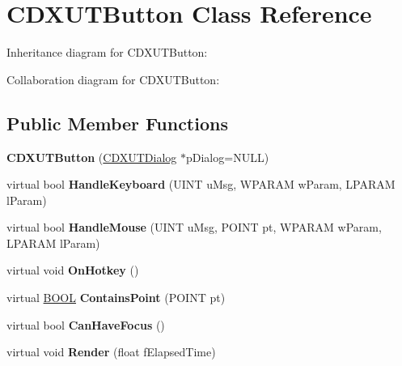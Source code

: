 \hypertarget{class_c_d_x_u_t_button}{\section{C\+D\+X\+U\+T\+Button Class Reference}
\label{class_c_d_x_u_t_button}
}


Inheritance diagram for C\+D\+X\+U\+T\+Button\+:


Collaboration diagram for C\+D\+X\+U\+T\+Button\+:
\subsection*{Public Member Functions}
\begin{DoxyCompactItemize}
\item 
\hypertarget{class_c_d_x_u_t_button_a05e8d838ea4ce93b2a7c70e78d41a95a}{{\bfseries C\+D\+X\+U\+T\+Button} (\hyperlink{class_c_d_x_u_t_dialog}{C\+D\+X\+U\+T\+Dialog} $\ast$p\+Dialog=N\+U\+L\+L)}\label{class_c_d_x_u_t_button_a05e8d838ea4ce93b2a7c70e78d41a95a}

\item 
\hypertarget{class_c_d_x_u_t_button_ae8da8eb3729b62ac3651eeca42d72530}{virtual bool {\bfseries Handle\+Keyboard} (U\+I\+N\+T u\+Msg, W\+P\+A\+R\+A\+M w\+Param, L\+P\+A\+R\+A\+M l\+Param)}\label{class_c_d_x_u_t_button_ae8da8eb3729b62ac3651eeca42d72530}

\item 
\hypertarget{class_c_d_x_u_t_button_ac0bb3da0b5cc77e4cadfbbed72d3e5b7}{virtual bool {\bfseries Handle\+Mouse} (U\+I\+N\+T u\+Msg, P\+O\+I\+N\+T pt, W\+P\+A\+R\+A\+M w\+Param, L\+P\+A\+R\+A\+M l\+Param)}\label{class_c_d_x_u_t_button_ac0bb3da0b5cc77e4cadfbbed72d3e5b7}

\item 
\hypertarget{class_c_d_x_u_t_button_ae63ba50da1c035a9aaa983bafd5eae97}{virtual void {\bfseries On\+Hotkey} ()}\label{class_c_d_x_u_t_button_ae63ba50da1c035a9aaa983bafd5eae97}

\item 
\hypertarget{class_c_d_x_u_t_button_a2209ea24f5ba76d7506b368c80940172}{virtual \hyperlink{_ice_types_8h_a050c65e107f0c828f856a231f4b4e788}{B\+O\+O\+L} {\bfseries Contains\+Point} (P\+O\+I\+N\+T pt)}\label{class_c_d_x_u_t_button_a2209ea24f5ba76d7506b368c80940172}

\item 
\hypertarget{class_c_d_x_u_t_button_a81d210561344736cca99976a8c8e6d57}{virtual bool {\bfseries Can\+Have\+Focus} ()}\label{class_c_d_x_u_t_button_a81d210561344736cca99976a8c8e6d57}

\item 
\hypertarget{class_c_d_x_u_t_button_a702c80701c37ac6a6eb937a6296dbbb9}{virtual void {\bfseries Render} (float f\+Elapsed\+Time)}\label{class_c_d_x_u_t_button_a702c80701c37ac6a6eb937a6296dbbb9}

\end{DoxyCompactItemize}
